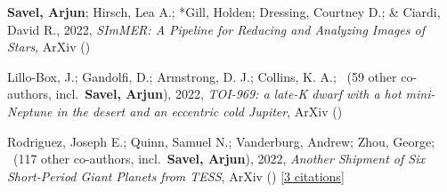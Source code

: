 \item[{\color{numcolor}\scriptsize3}] \textbf{Savel, Arjun}; Hirsch, Lea A.; *Gill, Holden; Dressing, Courtney D.; \& Ciardi, David R., 2022, \emph{SImMER: A Pipeline for Reducing and Analyzing Images of Stars}, ArXiv ()

\item[{\color{numcolor}\scriptsize2}] Lillo-Box, J.; Gandolfi, D.; Armstrong, D. J.; Collins, K. A.; \etal\ ({59} other co-authors, incl.\ \textbf{Savel, Arjun}), 2022, \emph{TOI-969: a late-K dwarf with a hot mini-Neptune in the desert and an eccentric cold Jupiter}, ArXiv ()

\item[{\color{numcolor}\scriptsize1}] Rodriguez, Joseph E.; Quinn, Samuel N.; Vanderburg, Andrew; Zhou, George; \etal\ ({117} other co-authors, incl.\ \textbf{Savel, Arjun}), 2022, \emph{Another Shipment of Six Short-Period Giant Planets from TESS}, ArXiv () [\href{https://ui.adsabs.harvard.edu/abs/2022arXiv220505709R}{3 citations}]